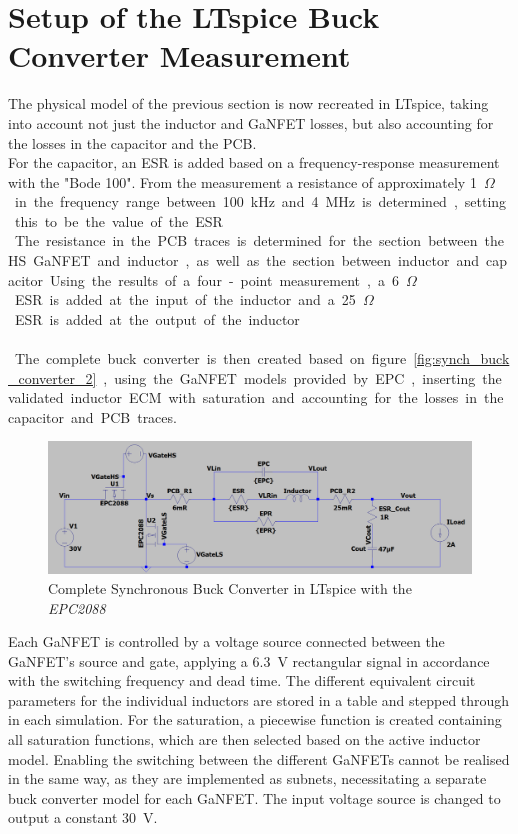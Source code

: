 \section{Setup of the LTspice Buck Converter Measurement} \label{sec:setup_of_the_ltspice_buck_converter_measurement}
The physical model of the previous section is now recreated in LTspice, taking into account not just the inductor and \ac{GaNFET} losses, but also accounting for the losses in the capacitor and the \ac{PCB}.\\
For the capacitor, an \ac{ESR} is added based on a frequency-response measurement with the "Bode 100". From the measurement a resistance of approximately \SI{1}{$\Omega$} in the frequency range between \SI{100}{\kilo\Hz} and \SI{4}{\mega\Hz} is determined, setting this to be the value of the \ac{ESR}.\\
The resistance in the \ac{PCB} traces is determined for the section between the \ac{HS} \ac{GaNFET} and inductor, as well as the section between inductor and capacitor. Using the results of a four-point measurement, a \SI{6}{\milli$\Omega$} \ac{ESR} is added at the input of the inductor and a \SI{25}{\milli$\Omega$} \ac{ESR} is added at the output of the inductor.\\\\
The complete buck converter is then created based on figure \ref{fig:synch_buck_converter_2}, using the GaNFET models provided by EPC, inserting the validated inductor \ac{ECM} with saturation and accounting for the losses in the capacitor and \ac{PCB} traces.
\begin{figure}[H]
    \centering
    \includegraphics[width=1\linewidth]{Bilder//Kapitel4/BC_LTspice.png}
    \caption{Complete Synchronous Buck Converter in LTspice with the \textit{EPC2088}}
    \label{fig:BC_LTspice}
\end{figure}
Each \ac{GaNFET} is controlled by a voltage source connected between the \ac{GaNFET}'s source and gate, applying a \SI{6.3}{\V} rectangular signal in accordance with the switching frequency and dead time. 
The different equivalent circuit parameters for the individual inductors are stored in a table and stepped through in each simulation. For the saturation, a piecewise function is created containing all saturation functions, which are then selected based on the active inductor model. Enabling the switching between the different \acp{GaNFET} cannot be realised in the same way, as they are implemented as subnets, necessitating a separate buck converter model for each \ac{GaNFET}. The input voltage source is changed to output a constant \SI{30}{\V}.\\\\
